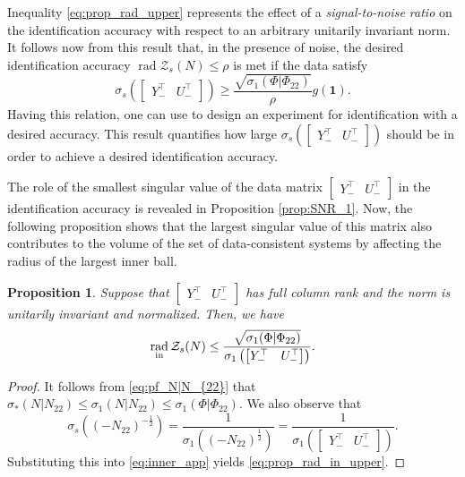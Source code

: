 \documentclass[pdflatex,sn-mathphys-num]{sn-jnl}%
\DeclareMathOperator{\rad}{rad}
\theoremstyle{thmstyleone}
\newtheorem{proposition}[theorem]{Proposition}
\begin{document}
Inequality \eqref{eq:prop_rad_upper} represents the effect of a \emph{signal-to-noise ratio} on the identification accuracy with respect to an arbitrary unitarily invariant norm. It follows now from this result that, in the presence of noise, the desired identification accuracy $\rad\mathcal{Z}_s(N)\leq\rho$ is met if the data satisfy
\begin{equation}
\label{eq:rad_s2n-1}
 \sigma_{s}\left(\begin{bmatrix}
Y_-^\top & U_-^\top
\end{bmatrix}\right) \geq \frac{\sqrt{\sigma_1(\Phi|\Phi_{22})}}{\rho}g(\mathbf{1}).
\end{equation}
Having this relation, one can use \cite[Thm. 6]{coulson2022quantitative} to design an experiment for identification with a desired accuracy. This result quantifies how large $\sigma_{s}\left(\begin{bmatrix}
Y_-^\top & U_-^\top
\end{bmatrix}\right)$ should be in order to achieve a desired identification accuracy. 

The role of the smallest singular value of the data matrix $\begin{bmatrix}
Y_-^\top & U_-^\top
\end{bmatrix}$ in the identification accuracy is revealed in Proposition \ref{prop:SNR_1}. Now, the following proposition shows that the largest singular value of this matrix also contributes to the volume of the set of data-consistent systems by affecting the radius of the largest inner ball. 

\begin{proposition}
\label{prop:SNR_2}
Suppose that $\begin{bmatrix}
Y_-^\top & U_-^\top
\end{bmatrix}$ has full column rank and the norm is unitarily invariant and normalized. Then, we have 
\begin{equation}
\label{eq:prop_rad_in_upper}
\rad_\textup{in}\mathcal{Z}_s(N)\leq \frac{\sqrt{\sigma_1(\Phi|\Phi_{22})}}{\sigma_{1}\left(\begin{bmatrix}
Y_-^\top & U_-^\top
\end{bmatrix}\right)}.
\end{equation}
\end{proposition}
\begin{proof}
It follows from \eqref{eq:pf_N|N_{22}} that $\sigma_*(N|N_{22})\leq\sigma_1(N|N_{22})\leq \sigma_1(\Phi|\Phi_{22})$. We also observe that
\begin{equation}
\sigma_s((-N_{22})^{-\frac{1}{2}})=\frac{1}{\sigma_1((-N_{22})^{\frac{1}{2}})}=\frac{1}{\sigma_{1}\left(\begin{bmatrix}
Y_-^\top & U_-^\top
\end{bmatrix}\right)}.
\end{equation}
Substituting this into \eqref{eq:inner_app} yields \eqref{eq:prop_rad_in_upper}.
\end{proof}
\end{document}
